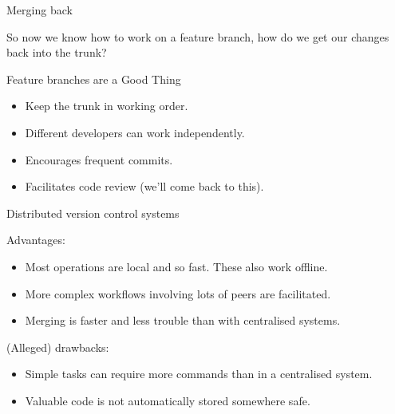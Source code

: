 \documentclass[t]{beamer}
\begin{document}


\begin{frame}{Merging back}

  So now we know how to work on a feature branch, how do we get our changes
  back into the trunk?
  
\end{frame}



\begin{frame}{Feature branches are a Good Thing}

  \begin{itemize}
  \item Keep the trunk in working order.
  \item Different developers can work independently.
  \item Encourages frequent commits.
  \item Facilitates code review (we'll come back to this).
  \end{itemize}
  
\end{frame}



\begin{frame}{Distributed version control systems}
  
  Advantages:
  \begin{itemize}
  \item Most operations are local and so fast. These also work offline.
  \item More complex workflows involving lots of peers are facilitated.
  \item Merging is faster and less trouble than with centralised systems.
  \end{itemize}

  (Alleged) drawbacks:
  \begin{itemize}
  \item Simple tasks can require more commands than in a centralised system.
  \item Valuable code is not automatically stored somewhere safe.
  \end{itemize}

\end{frame}
\end{document}
